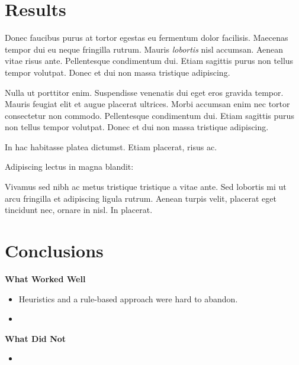\documentclass[a1,landscape]{a0poster}
\begin{document}
\begin{multicols}{3}
\section*{\large Results}

Donec faucibus purus at tortor egestas eu fermentum dolor facilisis. Maecenas tempor dui eu neque fringilla rutrum. Mauris \emph{lobortis} nisl accumsan. Aenean vitae risus ante. Pellentesque condimentum dui. Etiam sagittis purus non tellus tempor volutpat. Donec et dui non massa tristique adipiscing.


Nulla ut porttitor enim. Suspendisse venenatis dui eget eros gravida tempor. Mauris feugiat elit et augue placerat ultrices. Morbi accumsan enim nec tortor consectetur non commodo. Pellentesque condimentum dui. Etiam sagittis purus non tellus tempor volutpat. Donec et dui non massa tristique adipiscing. 

In hac habitasse platea dictumst. Etiam placerat, risus ac.

Adipiscing lectus in magna blandit:

Vivamus sed nibh ac metus tristique tristique a vitae ante. Sed lobortis mi ut arcu fringilla et adipiscing ligula rutrum. Aenean turpis velit, placerat eget tincidunt nec, ornare in nisl. In placerat.


\color{SaddleBrown} %

\section*{\large Conclusions}
\textbf{What Worked Well}
\begin{itemize}
    \item Heuristics and a rule-based approach were hard to abandon.
    \item 
\end{itemize}
\vspace{0.7em}
\textbf{What Did Not}
\begin{itemize}
    \item 
\end{itemize}

\color{DarkSlateGray} %


\nocite{*} %

\end{multicols}
\end{document}

